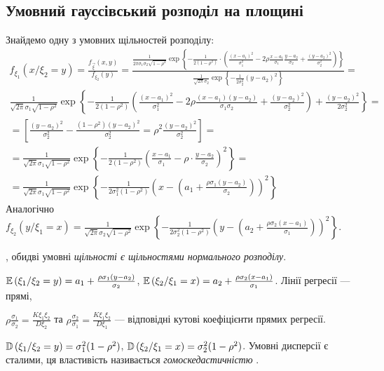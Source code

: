 \subsection{Умовний гауссівський розподіл на площині}
Знайдемо одну з умовних щільностей розподілу:
\begin{gather*}
    f_{\xi_1}(x/\xi_2 = y) = \frac{f_{\vec{\xi}}(x,y)}{f_{\xi_2}(y)} = 
    \frac{\frac{1}{2\pi\sigma_1\sigma_2\sqrt{1-\rho^2}} \exp\left\{
        -\frac{1}{2(1-\rho^2)}\cdot
        \left(\frac{(x-a_1)^2}{\sigma_1^2} -
        2\rho\frac{x-a_1}{\sigma_1}\frac{y-a_2}{\sigma_2} +
        \frac{(y-a_2)^2}{\sigma_2^2}
        \right)\right\} }{
            \frac{1}{\sqrt{2\pi}\sigma_2} \exp\left\{-\frac{1}{2\sigma_2^2}(y-a_2)^2\right\}
        } = \\
        \frac{1}{\sqrt{2\pi}\sigma_1\sqrt{1-\rho^2}} \exp\left\{
            -\frac{1}{2(1-\rho^2)}
        \left(\frac{(x-a_1)^2}{\sigma_1^2} -
        2\rho\frac{(x-a_1)(y-a_2)}{\sigma_1\sigma_2} +
        \frac{(y-a_2)^2}{\sigma_2^2}
        \right) +
        \frac{(y-a_2)^2}{2\sigma_2^2}
        \right\} = \\
        = \left [ \frac{(y-a_2)^2}{\sigma_2^2} - \frac{(1-\rho^2)(y-a_2)^2}{\sigma_2^2} = \rho^2 \frac{(y-a_2)^2}{\sigma_2^2}\right]=\\
        = \frac{1}{\sqrt{2\pi}\sigma_1\sqrt{1-\rho^2}} \exp\left\{-\frac{1}{2(1-\rho^2)}\left( \frac{x-a_1}{\sigma_1} - \rho\cdot\frac{y-a_2}{\sigma_2}\right)^2\right\} = \\
        = \frac{1}{\sqrt{2\pi}\sigma_1\sqrt{1-\rho^2}} \exp\left\{-\frac{1}{2\sigma_1^2(1-\rho^2)}\left( x- \left( a_1 + \frac{\rho\sigma_1(y-a_2)}{\sigma_2}\right)\right)^2\right\}
\end{gather*}
Аналогічно $f_{\xi_2}(y/\xi_1 = x) = \frac{1}{\sqrt{2\pi}\sigma_2\sqrt{1-\rho^2}} \exp\left\{-\frac{1}{2\sigma_2^2(1-\rho^2)}\left( y- \left( a_2 + \frac{\rho\sigma_2(x-a_1)}{\sigma_1}\right)\right)^2\right\}$.
\vspace{0.5em}

, обидві умовні \emph{щільності є щільностями нормального розподілу}.

$\mathbb{E}\left( \xi_1 / \xi_2 = y\right) = a_1 + \frac{\rho\sigma_1(y-a_2)}{\sigma_2}$, 
$\mathbb{E}\left( \xi_2 / \xi_1 = x\right) = a_2 + \frac{\rho\sigma_2(x-a_1)}{\sigma_1}$. Лінії регресії --- прямі,

\noindent
$\rho\frac{\sigma_1}{\sigma_2} = \frac{K\xi_1\xi_2}{D\xi_2}$ та $\rho\frac{\sigma_2}{\sigma_1}  = \frac{K\xi_1\xi_2}{D\xi_1}$ --- відповідні кутові коефіцієнти прямих регресії.

$\mathbb{D}\left( \xi_1 / \xi_2 = y\right) = \sigma_1^2(1-\rho^2)$, 
$\mathbb{D}\left( \xi_2 / \xi_1 = x\right) = \sigma_2^2(1-\rho^2)$. Умовні дисперсії є сталими, ця властивість називається \emph{гомоскедастичністю} 
.